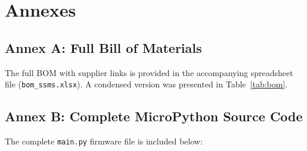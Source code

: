 \chapter{Annexes}
\label{ch:annexes}

\section{Annex A: Full Bill of Materials}
\label{annex:bom}

The full BOM with supplier links is provided in the accompanying spreadsheet file (\texttt{bom\_ssms.xlsx}). A condensed version was presented in Table~\ref{tab:bom}.

\section{Annex B: Complete MicroPython Source Code}
\label{annex:fw-code}

The complete \texttt{main.py} firmware file is included below:

